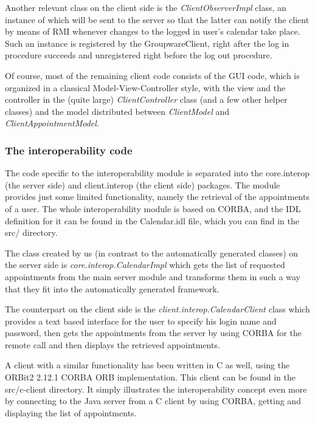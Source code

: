 \documentclass[a4paper,10pt]{article}
\begin{document}
Another relevant class on the client side is the \textit{ClientObserverImpl} class, an
instance of which will be sent to the server so that the latter can notify the client by
means of RMI whenever changes to the logged in user's calendar take place. Such
an instance is registered by the GroupwareClient, right after the log in procedure
succeeds and unregistered right before the log out procedure.

Of course, most of the remaining client code consists of the GUI code, which is organized
in a classical Model-View-Controller style, with the view and the controller in the
(quite large) \textit{ClientController} class (and a few other helper classes) and the
model distributed between \textit{ClientModel} and \textit{ClientAppointmentModel}.

\subsubsection*{The interoperability code}

The code specific to the interoperability module is separated into the core.interop (the
server side) and client.interop (the client side) packages. The module provides just some
limited functionality, namely the retrieval of the appointments of a user. The whole
interoperability module is based on CORBA, and the IDL definition for it can be found
in the Calendar.idl file, which you can find in the src/ directory.

The class created by us (in contrast to the automatically generated classes) on the
server side is \textit{core.interop.CalendarImpl} which gets the list of requested
appointments from the main server module and transforms them in such a way that
they fit into the automatically generated framework.

The counterpart on the client side is the \textit{client.interop.CalendarClient} class
which provides a text based interface for the user to specify his login name and
password, then gets the appointments from the server by using CORBA for the
remote call and then displays the retrieved appointments.

A client with a similar functionality has been written in C as well, using the ORBit2 2.12.1
CORBA ORB implementation. This client can be found in the src/c-client directory. It
simply illustrates the interoperability concept even more by connecting to the Java
server from a C client by using CORBA, getting and displaying the list of appointments.
\end{document}
